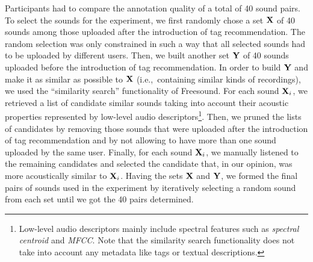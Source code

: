 \begin{itemize}
Participants had to compare the annotation quality of a total of 40 sound pairs. To select the sounds for the experiment, we first randomly chose a set $\mathbf{X}$ of 40 sounds among those uploaded after the introduction of tag recommendation. The random selection was only constrained in such a way that all selected sounds had to be uploaded by different users. Then, we built another set $\mathbf{Y}$ of 40 sounds uploaded before the introduction of tag recommendation. In order to build $\mathbf{Y}$ and make it as similar as possible to $\mathbf{X}$ (i.e.,~containing similar kinds of recordings), we used the ``similarity search'' functionality of Freesound. For each sound $\mathbf{X}_i$, we retrieved a list of candidate similar sounds taking into account their acoustic properties represented by low-level audio descriptors\footnote{Low-level audio descriptors mainly include spectral features such as \emph{spectral centroid} and \emph{MFCC}. Note that the similarity search functionality does not take into account any metadata like tags or textual descriptions.}. Then, we pruned the lists of candidates by removing those sounds that were uploaded after the introduction of tag recommendation and by not allowing to have more than one sound uploaded by the same user. Finally, for each sound $\mathbf{X}_i$, we manually listened to the remaining candidates and selected the candidate that, in our opinion, was more acoustically similar to $\mathbf{X}_i$. %
Having the sets $\mathbf{X}$ and $\mathbf{Y}$, we formed the final pairs of sounds used in the experiment by iteratively selecting a random sound from each set until we got the 40 pairs determined. 


\end{itemize}

